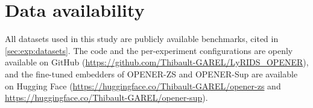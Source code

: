 \section*{Data availability}
\label{sec:data}
All datasets used in this study are publicly available benchmarks, cited in \autoref{sec:exp:datasets}.
The code and the per-experiment configurations are openly available on GitHub (\url{https://github.com/Thibault-GAREL/LyRIDS_OPENER}), and the fine-tuned embedders of OPENER-ZS and OPENER-Sup are available on Hugging Face (\url{https://huggingface.co/Thibault-GAREL/opener-zs} and \url{https://huggingface.co/Thibault-GAREL/opener-sup}).
